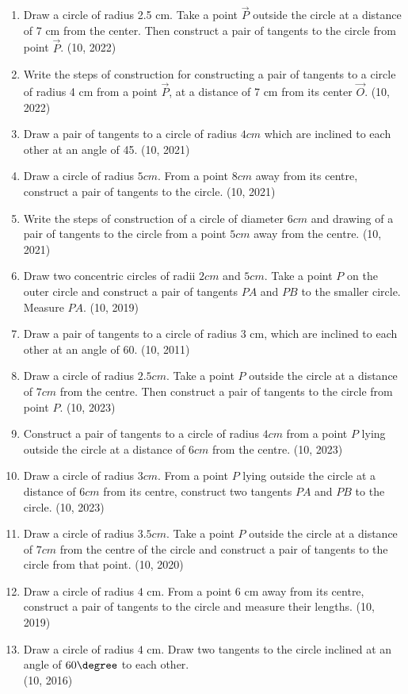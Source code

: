 \begin{enumerate}[label=\thesubsection.\arabic*,ref=\thesubsection.\theenumi]
	\item Draw a circle of radius 2.5 cm. Take a point $\vec{P}$ outside the circle at a distance of 7 cm from the center. Then construct a pair of tangents to the circle from point $\vec{P}$.
\hfill (10, 2022)

	\item Write the steps of construction for constructing a pair of tangents to a circle of radius 4 cm from a point $\vec{P}$, at a distance of 7 cm from its center $\vec{O}$.
\hfill (10, 2022)
	\item Draw a pair of tangents to a circle of radius $4 cm$ which are inclined to each other at an angle of 45\degree.	
\hfill (10, 2021)
	\item Draw a circle of radius $5 cm$. From a point $8 cm$ away from its centre, construct a pair of tangents to the circle.
\hfill (10, 2021)
	\item Write the steps of construction of a circle of diameter $6 cm$ and drawing of a pair of tangents to the circle from a point $5 cm$ away from the centre.
\hfill (10, 2021)
\item Draw two concentric circles of radii $2 cm$ and $5 cm$. Take a point $P$ on the outer circle and construct a pair of tangents $PA$ and $PB$ to the smaller circle. Measure $PA$.  
\hfill (10, 2019)
    \item Draw a pair of tangents to a circle of radius $3$ cm, which are inclined to each other at an angle of 60\degree.
\hfill (10, 2011)
\item Draw a circle of radius $2.5cm$. Take a point $P$ outside the circle at a distance of $7cm$ from the centre. Then construct a pair of tangents to the circle from point $P$.
\hfill (10, 2023)
\item Construct a pair of tangents to a circle of radius $4cm$ from a point $P$ lying outside the circle at a distance of $6cm$ from the centre.
\hfill (10, 2023)
	\item  Draw a circle of radius $3 cm$. From a point $P$ lying outside the 
       circle at a distance of $6cm$ from its centre, construct two tangents
       $PA$ and $PB$ to the circle.
\hfill (10, 2023)
	\item Draw a circle of radius $3.5 cm$. Take a point $P$ outside the circle at a distance of $7 cm$ from the centre of the circle and construct a pair of tangents to the circle from that point.
\hfill (10, 2020)
\item Draw a circle of radius $4$ cm. From a point $6$ cm away from its centre, construct a pair of tangents to the circle and measure their lengths.
\hfill (10, 2019)
\item Draw a circle of radius $4$ cm. Draw two tangents to the circle inclined at an angle of $ 60 \degree $ to each other.\\
\hfill (10, 2016)

\end{enumerate}
